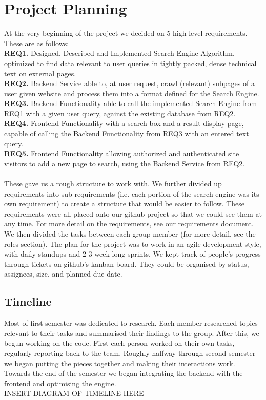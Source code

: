 \section{Project Planning}
At the very beginning of the project we decided on 5 high level requirements. These are as follows: \\
\textbf{REQ1.} Designed, Described and Implemented Search Engine Algorithm, optimized to find data relevant to user queries in tightly packed, dense technical text on external pages. \\
\textbf{REQ2.} Backend Service able to, at user request, crawl (relevant) subpages of a user given website and process them into a format defined for the Search Engine. \\
\textbf{REQ3.} Backend Functionality able to call the implemented Search Engine from REQ1 with a given user query, against the existing database from REQ2. \\
\textbf{REQ4.} Frontend Functionality with a search box and a result display page, capable of calling the Backend Functionality from REQ3 with an entered text query. \\
\textbf{REQ5.} Frontend Functionality allowing authorized and authenticated site visitors to add a new page to search, using the Backend Service from REQ2.\\ \\

These gave us a rough structure to work with. We further divided up requirements into sub-requirements (i.e. each portion of the search engine was its own requirement) to create a structure that would be easier to follow. These requirements were all placed onto our github project so that we could see them at any time. For more detail on the requirements, see our requirements document. \\
We then divided the tasks between each group member (for more detail, see the roles section). The plan for the project was to work in an agile development style, with daily standups and 2-3 week long sprints. We kept track of people's progress through tickets on github's kanban board. They could be organised by status, assignees, size, and planned due date.\\

\subsection{Timeline}
Most of first semester was dedicated to research. Each member researched topics relevant to their tasks and summarised their findings to the group. After this, we begun working on the code. First each person worked on their own tasks, regularly reporting back to the team. Roughly halfway through second semester we began putting the pieces together and making their interactions work. 
Towards the end of the semester we began integrating the backend with the frontend and optimising the engine.\\
INSERT DIAGRAM OF TIMELINE HERE 
